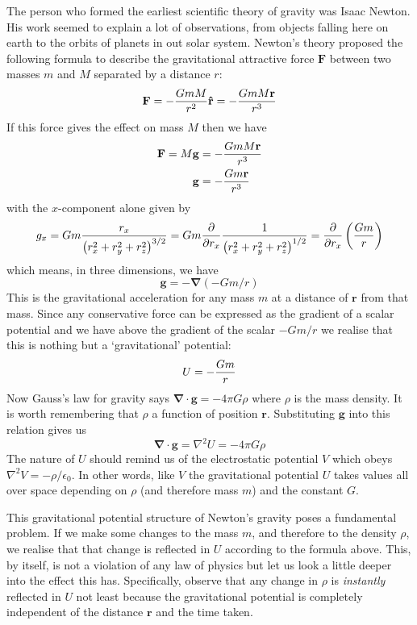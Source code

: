 \documentclass[english,seminar]{lecture}
\begin{document}
The person who formed the earliest scientific theory of gravity was Isaac Newton. His work seemed to explain a lot of observations, from objects falling here on earth to the orbits of planets in out solar system. Newton's theory proposed the following formula to describe the gravitational attractive force $\mathbf{F}$ between two masses $m$ and $M$ separated by a distance $r$: $$\mathbf{F} = - {GmM \over r^2} \mathbf{\hat{r}} = - {GmM \mathbf{r} \over r^3}$$ If this force gives the effect on mass $M$ then we have 
\begin{align*}
	\mathbf{F} = M\mathbf{g} &= - {GmM \mathbf{r} \over r^3} \\
					\mathbf{g} &= - {Gm \mathbf{r} \over r^3}
\end{align*}%
with the $x$-component alone given by
$$g_x = Gm{r_x \over \left( r_x^2 + r_y^2 + r_z^2 \right)^{3/2}} = Gm {\partial \over \partial r_x} {1 \over \left( r_x^2 + r_y^2 + r_z^2 \right)^{1/2}} = {\partial \over \partial r_x} \left({Gm\over r}\right)$$
which means, in three dimensions, we have
$$\mathbf{g} = -\boldsymbol{\nabla}\left( - Gm / r \right)$$
This is the gravitational acceleration for any mass $m$ at a distance of $\mathbf{r}$ from that mass. Since any conservative force can be expressed as the gradient of a scalar potential and we have above the gradient of the scalar $-Gm/r$ we realise that this is nothing but a `gravitational' potential: $$U = -{Gm\over r}$$ Now Gauss's law for gravity says $\boldsymbol{\nabla}\cdot\mathbf{g} = -4\pi G\rho$ where $\rho$ is the mass density. It is worth remembering that $\rho$ a function of position $\mathbf{r}$. Substituting $\mathbf{g}$ into this relation gives us $$ \boldsymbol{\nabla} \cdot \mathbf{g} = \nabla^2 U = -4\pi G\rho$$ The nature of $U$ should remind us of the electrostatic potential $V$ which obeys $\nabla^2 V = -\rho/\epsilon_0$. In other words, like $V$ the gravitational potential $U$ takes values all over space depending on $\rho$ (and therefore mass $m$) and the constant $G$.

This gravitational potential structure of Newton's gravity poses a fundamental problem. If we make some changes to the mass $m$, and therefore to the density $\rho$, we realise that that change is reflected in $U$ according to the formula above. This, by itself, is not a violation of any law of physics but let us look a little deeper into the effect this has. Specifically, observe that any change in $\rho$ is \textit{instantly} reflected in $U$ not least because the gravitational potential is completely independent of the distance $\mathbf{r}$ and the time taken.
\end{document}
